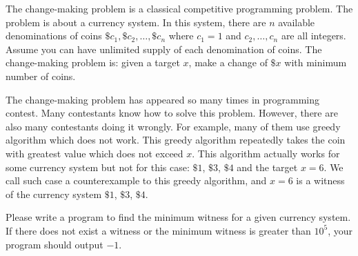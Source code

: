The change-making problem is a classical competitive programming problem. 
The problem is about a currency system. In this system, 
there are $n$ available denominations of coins $\$c_1,\$c_2,\ldots,\$c_n$
where $c_1=1$ and $c_2,\ldots,c_n$ are all integers.
Assume you can have unlimited supply of each denomination of coins.
The change-making problem is:
given a target $x$, make a change of $\$x$ with minimum number of coins.

The change-making problem has appeared so many times in programming contest.
Many contestants know how to solve this problem.
However, there are also many contestants doing it wrongly.
For example, many of them use greedy algorithm which does not work.
This greedy algorithm repeatedly takes the coin with greatest value
which does not exceed $x$. 
This algorithm actually works for some currency system 
but not for this case: $\$1$, $\$3$, $\$4$ and the target $x=6$.
We call such case a counterexample to this greedy algorithm, 
and $x=6$ is a witness of the currency system $\$1$, $\$3$, $\$4$.

Please write a program to find the minimum witness for a given currency system.
If there does not exist a witness or the minimum witness is greater than 
$10^5$, your program should output $-1$.
